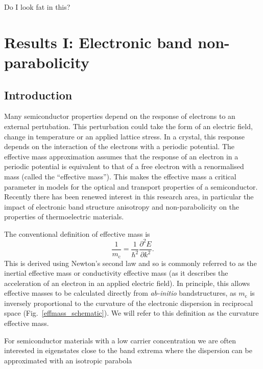 \begin{savequote}[8cm]
Do I look fat in this?
\end{savequote}

\chapter{\label{ch:4-effmass}Results I: Electronic band non-parabolicity}

\section{Introduction}

Many semiconductor properties depend on the response of electrons to an external pertubation.
This perturbation could take the form of an electric field, change in temperature or an applied lattice stress.  %
In a crystal, this response depends on the interaction of the electrons with a periodic potential. 
The effective mass approximation assumes that the response of an electron in a periodic potential is equivalent to that of a free electron with a renormalised mass (called the ``effective mass'').
This makes the effective mass a critical parameter in models for the optical and transport properties of a semiconductor.
Recently there has been renewed interest in this research area, in particular the impact of electronic band structure anisotropy and non-parabolicity on the properties of thermoelectric materials.\autocite{Gibbs2017,Mecholsky2014}

The conventional definition of effective mass is
\begin{equation} \label{curvature}
\frac{1}{m_\text{c}}= \frac{1}{\hbar^2}\frac{\partial^2E}{\partial k^2}.
\end{equation}
This is derived using Newton's second law\autocite{Ashcroft1976,Ariel2012b} and so is commonly referred to as the inertial effective mass or conductivity effective mass (as it describes the acceleration of an electron in an applied electric field).
In principle, this allows effective masses to be calculated directly from \textit{ab-initio} bandstructures,
as $m_\text{c}$ is inversely proportional to the curvature of the electronic dispersion in reciprocal space (Fig.\ \ref{effmass_schematic}). 
We will refer to this definition as the curvature effective mass.

For semiconductor materials with a low carrier concentration we are often interested in eigenstates close to the band extrema where the dispersion can be approximated with an isotropic parabola

